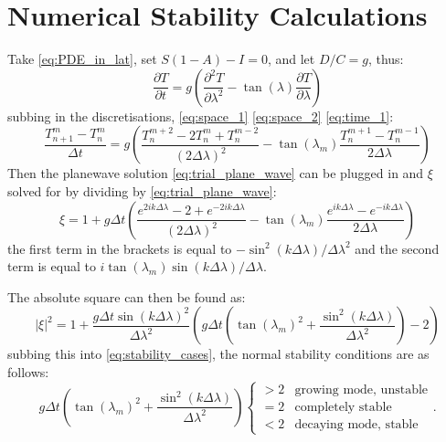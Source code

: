 \documentclass[12pt, onecolumn]{revtex4-2}    %
\begin{document}
\clearpage

\appendix

\section{Numerical Stability Calculations} \label{app:numstabworkings}

Take \eqref{eq:PDE_in_lat}, set $S(1-A) - I = 0$,
and let $D / C = g$, thus:
\begin{equation*}
    \frac{\partial T}{\partial t} = g \left(\frac{\partial^2 T}{\partial \lambda^2} - \tan(\lambda)\frac{\partial T}{\partial \lambda}\right)
\end{equation*}
subbing in the discretisations, \eqref{eq:space_1} \eqref{eq:space_2} \eqref{eq:time_1}:
\begin{equation*}
    \frac{T^m_{n+1}-T^m_n}{\Delta t} = g \left(\frac{T^{m+2}_{n} - 2T^{m}_{n} + T^{m-2}_{n}}{(2\Delta \lambda)^2} - \tan(\lambda_m)\frac{T^{m+1}_{n} - T^{m-1}_{n}}{2 \Delta \lambda}\right)
\end{equation*}
Then the planewave solution \eqref{eq:trial_plane_wave} can be plugged in and $\xi$ solved for by dividing by \eqref{eq:trial_plane_wave}:
\begin{equation*}
    \xi = 1 + g \Delta t \left( \frac{e^{2ik\Delta\lambda} - 2 + e^{-2ik\Delta\lambda}}{(2\Delta\lambda)^2} - \tan(\lambda_m) \frac{e^{ik\Delta\lambda} - e^{-ik\Delta\lambda}}{2\Delta\lambda} \right)
\end{equation*}
the first term in the brackets is equal to $-\sin^2(k\Delta\lambda) / \Delta\lambda^2$ and the second term is equal to $i\tan(\lambda_m)\sin(k\Delta\lambda) / \Delta\lambda$.

The absolute square can then be found as:
\begin{equation*}
    |\xi|^2 = 1 + \frac{g \Delta t \sin(k\Delta\lambda)^2}{\Delta \lambda^2}\left(g\Delta t\left(\tan(\lambda_m)^2 + \frac{\sin^2(k\Delta\lambda)}{\Delta\lambda^2}\right) - 2 \right)
\end{equation*}
subbing this into \eqref{eq:stability_cases}, the normal stability conditions are as follows:
\begin{equation}\label{appeq:normalstability}
    g\Delta t\left(\tan(\lambda_m)^2 + \frac{\sin^2(k\Delta\lambda)}{\Delta\lambda^2}\right)
    \begin{cases}
        > 2 & \text{growing mode, unstable} \\
        = 2 & \text{completely stable}      \\
        < 2 & \text{decaying mode, stable}
    \end{cases}
    .
\end{equation}
\end{document}
